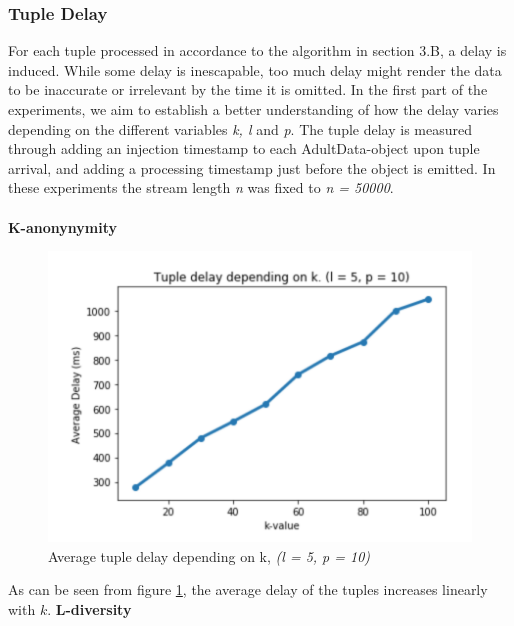 \subsubsection{Tuple Delay}
For each tuple processed in accordance to the algorithm in section 3.B, a delay is induced. While some delay is inescapable, too much delay might render the data to be inaccurate or irrelevant by the time it is omitted. In the first part of the experiments, we aim to establish a better understanding of how the delay varies depending on the different variables \textit{k, l} and \textit{p}. The tuple delay is measured through adding an injection timestamp to each AdultData-object upon tuple arrival, and adding a processing timestamp just before the object is emitted. In these experiments the stream length \textit{n} was fixed to \textit{n = 50000}.\\
\\
\textbf{K-anonynymity} \\
\begin{figure}[H]
    \centering
    \includegraphics[scale=0.7]{Images/k-values.png}
    \caption{Average tuple delay depending on k, \textit{(l = 5, p = 10)}}
    \label{fig:kvalues}
\end{figure}

\noindent As can be seen from figure \ref{fig:kvalues}, the average delay of the tuples increases linearly with $k$.
\newpage
\noindent \textbf{L-diversity} \\

